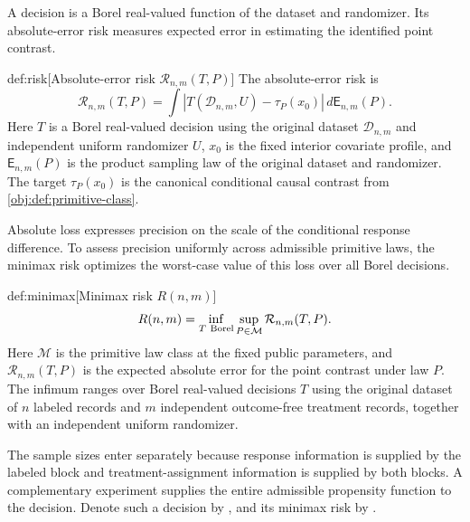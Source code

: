 \documentclass[11pt]{article}
\begin{document}
A decision  is a Borel real-valued function of the dataset and randomizer. Its absolute-error risk  measures expected error in estimating the identified point contrast.

\begin{definitionv}{def:risk}[Absolute-error risk $\mathcal R_{n,m}(T,P)$]
The absolute-error risk is
\[
\mathcal R_{n,m}(T,P)
=
\int
\left|T(\mathcal D_{n,m},U)-\tau_P(x_0)\right|
\,d\mathsf E_{n,m}(P).
\]
Here \(T\) is a Borel real-valued decision using the original dataset \(\mathcal D_{n,m}\) and independent uniform randomizer \(U\), \(x_0\) is the fixed interior covariate profile, and \(\mathsf E_{n,m}(P)\) is the product sampling law of the original dataset and randomizer. The target \(\tau_P(x_0)\) is the canonical conditional causal contrast from \cref{obj:def:primitive-class}.
\end{definitionv}

Absolute loss expresses precision on the scale of the conditional response difference. To assess precision uniformly across admissible primitive laws, the minimax risk  optimizes the worst-case value of this loss over all Borel decisions.

\begin{definitionv}{def:minimax}[Minimax risk \(R(n,m)\)]
\[
R(n,m)=\inf_{T\ {\rm Borel}}\sup_{P\in\mathcal M}\mathcal R_{n,m}(T,P).
\]
Here \(\mathcal M\) is the primitive law class at the fixed public parameters, and \(\mathcal R_{n,m}(T,P)\) is the expected absolute error for the point contrast under law \(P\). The infimum ranges over Borel real-valued decisions \(T\) using the original dataset of \(n\) labeled records and \(m\) independent outcome-free treatment records, together with an independent uniform randomizer.
\end{definitionv}

The sample sizes enter separately because response information is supplied by the labeled block and treatment-assignment information is supplied by both blocks. A complementary experiment supplies the entire admissible propensity function to the decision. Denote such a decision by , and its minimax risk by .
\end{document}
